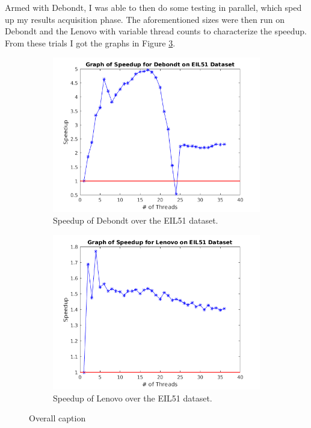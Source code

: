 \documentclass[10pt,letterpaper]{article}
\begin{document}
Armed with Debondt, I was able to then do some testing in parallel, which sped up my results acquisition phase. The aforementioned sizes were then run on Debondt and the Lenovo with variable thread counts to characterize the speedup. From these trials I got the graphs in Figure \ref{fig:EILspeedups}.


\begin{figure}[t]
\centering
   \begin{subfigure}{0.49\linewidth} \centering
	\includegraphics[width=\textwidth]{../img/Debondt_speedup.png} 
     \caption{Speedup of Debondt over the EIL51 dataset.}\label{fig:figA}
   \end{subfigure}
   \begin{subfigure}{0.49\linewidth} \centering
	\includegraphics[width=\textwidth]{../img/Lenovo_Speedup.png} 
     \caption{Speedup of Lenovo over the EIL51 dataset.}\label{fig:figB}
   \end{subfigure}
\caption{Overall caption} \label{fig:EILspeedups}
\end{figure}
\end{document}
